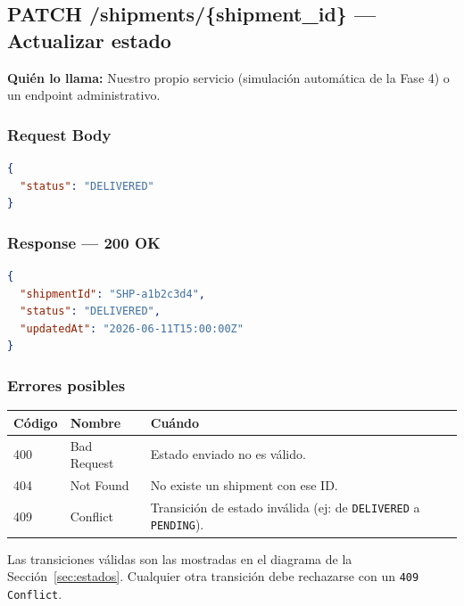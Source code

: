 \documentclass[11pt, a4paper]{article}
\begin{document}
\subsection{PATCH /shipments/\{shipment\_id\} --- Actualizar estado}

\textbf{Quién lo llama:} Nuestro propio servicio (simulación automática de la Fase 4) o un endpoint administrativo.

\subsubsection*{Request Body}
\begin{lstlisting}[language=json]
{
  "status": "DELIVERED"
}
\end{lstlisting}

\subsubsection*{Response --- 200 OK}
\begin{lstlisting}[language=json]
{
  "shipmentId": "SHP-a1b2c3d4",
  "status": "DELIVERED",
  "updatedAt": "2026-06-11T15:00:00Z"
}
\end{lstlisting}

\subsubsection*{Errores posibles}
\begin{table}[h!]
\centering
\begin{tabularx}{\textwidth}{l l X}
  \toprule
  \textbf{Código} & \textbf{Nombre} & \textbf{Cuándo} \\
  \midrule
  400 & Bad Request             & Estado enviado no es válido. \\
  404 & Not Found               & No existe un shipment con ese ID. \\
  409 & Conflict                & Transición de estado inválida (ej: de \texttt{DELIVERED} a \texttt{PENDING}). \\
  \bottomrule
\end{tabularx}
\end{table}

\begin{infobox}
  Las transiciones válidas son las mostradas en el diagrama de la
  Sección~\ref{sec:estados}. Cualquier otra transición debe rechazarse
  con un \texttt{409 Conflict}.
\end{infobox}
\end{document}
